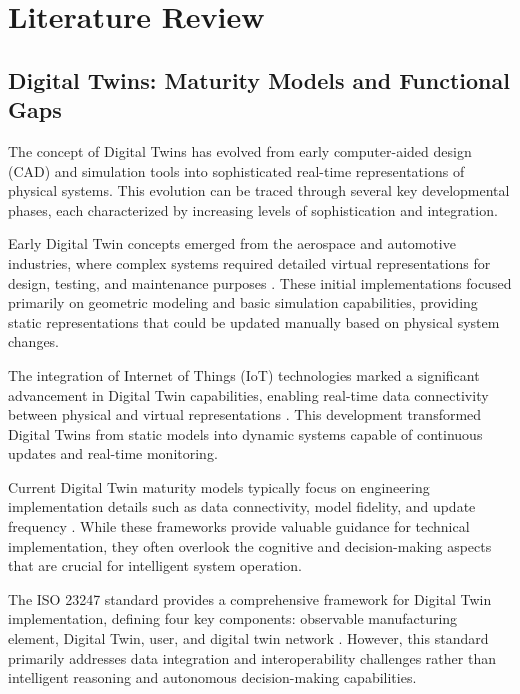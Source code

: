 
\chapter{Literature Review} \label{chp:literature}

\section{Digital Twins: Maturity Models and Functional Gaps}

The concept of Digital Twins has evolved from early computer-aided design (CAD) and simulation tools into sophisticated real-time representations of physical systems. This evolution can be traced through several key developmental phases, each characterized by increasing levels of sophistication and integration.

Early Digital Twin concepts emerged from the aerospace and automotive industries, where complex systems required detailed virtual representations for design, testing, and maintenance purposes \cite{grieves2014digital}. These initial implementations focused primarily on geometric modeling and basic simulation capabilities, providing static representations that could be updated manually based on physical system changes.

The integration of Internet of Things (IoT) technologies marked a significant advancement in Digital Twin capabilities, enabling real-time data connectivity between physical and virtual representations \cite{qi2021digital}. This development transformed Digital Twins from static models into dynamic systems capable of continuous updates and real-time monitoring.

Current Digital Twin maturity models typically focus on engineering implementation details such as data connectivity, model fidelity, and update frequency \cite{jones2020characterising, lu2020digital}. While these frameworks provide valuable guidance for technical implementation, they often overlook the cognitive and decision-making aspects that are crucial for intelligent system operation.

The ISO 23247 standard provides a comprehensive framework for Digital Twin implementation, defining four key components: observable manufacturing element, Digital Twin, user, and digital twin network \cite{ISO23247}. However, this standard primarily addresses data integration and interoperability challenges rather than intelligent reasoning and autonomous decision-making capabilities.

